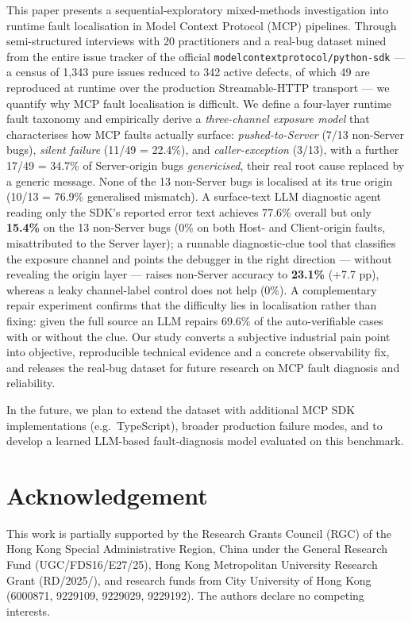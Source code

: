 This paper presents a sequential-exploratory mixed-methods investigation into runtime fault
localisation in Model Context Protocol (MCP) pipelines. Through semi-structured interviews
with 20 practitioners and a real-bug dataset mined from the entire issue tracker of the
official \verb|modelcontextprotocol/python-sdk| --- a census of 1,343 pure issues reduced to
342 active defects, of which 49 are reproduced at runtime over the production Streamable-HTTP
transport --- we quantify why MCP fault localisation is difficult. We define a four-layer
runtime fault taxonomy and empirically derive a \emph{three-channel exposure model} that
characterises how MCP faults actually surface: \emph{pushed-to-Server} (7/13 non-Server bugs),
\emph{silent failure} (11/49 = 22.4\%), and \emph{caller-exception} (3/13), with a further
17/49 = 34.7\% of Server-origin bugs \emph{genericised}, their real root cause replaced by a
generic message. None of the 13 non-Server bugs is localised at its true origin (10/13 = 76.9\%
generalised mismatch). A surface-text LLM diagnostic agent reading only the SDK's reported
error text achieves 77.6\% overall but only \textbf{15.4\%} on the 13 non-Server bugs (0\% on
both Host- and Client-origin faults, misattributed to the Server layer); a runnable
diagnostic-clue tool that classifies the exposure channel and points the debugger in the right
direction --- without revealing the origin layer --- raises non-Server accuracy to
\textbf{23.1\%} (+7.7 pp), whereas a leaky channel-label control does not help (0\%). A
complementary repair experiment confirms that the difficulty lies in localisation rather than
fixing: given the full source an LLM repairs 69.6\% of the auto-verifiable cases with or
without the clue. Our study converts a subjective industrial pain point into objective,
reproducible technical evidence and a concrete observability fix, and releases the real-bug
dataset for future research on MCP fault diagnosis and reliability.

In the future, we plan to extend the dataset with additional MCP SDK implementations (e.g.\
TypeScript), broader production failure modes, and to develop a learned LLM-based
fault-diagnosis model evaluated on this benchmark.

\section*{Acknowledgement}

This work is partially supported by the Research Grants Council (RGC) of the Hong Kong
Special Administrative Region, China under the General Research Fund (UGC/FDS16/\allowbreak E27/25),
Hong Kong Metropolitan University Research Grant (RD/2025/\allowbreak 1.24), and research funds from City
University of Hong Kong (6000871, 9229109, 9229029, 9229192). The authors declare no competing
interests.

\FloatBarrier
